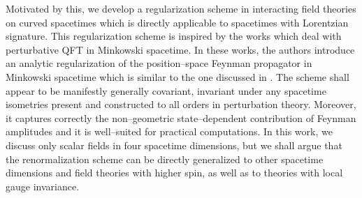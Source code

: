 \documentclass[11pt]{book}
\theoremstyle{break}
\begin{document}
\bigskip


Motivated by this, we develop a regularization scheme in interacting field theories on curved spacetimes which is directly applicable to spacetimes with Lorentzian signature. This regularization scheme is inspired by the works \cite{KELLER_2010,DFKR_2014} which deal with perturbative QFT in Minkowski spacetime. In these works, the authors introduce an analytic regularization of the position--space Feynman propagator in Minkowski spacetime which is similar to the one discussed in \cite{BG_1972}. The scheme shall appear to be manifestly generally covariant, invariant under any spacetime isometries present and constructed to all orders in perturbation theory. Moreover, it captures correctly the non--geometric state--dependent contribution of Feynman amplitudes and it is well--suited for practical computations. In this work, we discuss only scalar fields in four spacetime dimensions, but we shall argue that the renormalization scheme can be directly generalized to other spacetime dimensions and field theories with higher spin, as well as to theories with local gauge invariance.\par%
\end{document}
